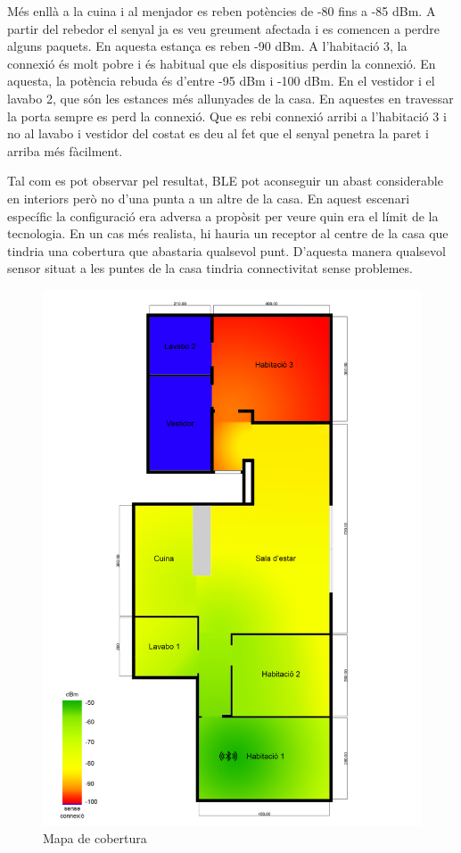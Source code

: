 Més enllà a la cuina i al menjador es reben potències de -80 fins a -85 dBm.
A partir del rebedor el senyal ja es veu greument afectada i es comencen a perdre alguns paquets. En aquesta estança es reben -90 dBm. A l'habitació 3, la connexió és molt pobre i és habitual que els dispositius perdin la connexió. En aquesta, la potència rebuda és d'entre -95 dBm i -100 dBm.
En el vestidor i el lavabo 2, que són les estances més allunyades de la casa. En aquestes en travessar la porta sempre es perd la connexió.
Que es rebi connexió arribi a l'habitació 3 i no al lavabo i vestidor del costat es deu al fet que el senyal penetra la paret i arriba més fàcilment.

Tal com es pot observar pel resultat, BLE pot aconseguir un abast considerable en interiors però no d'una punta a un altre de la casa.
En aquest escenari específic la configuració era adversa a propòsit per veure quin era el límit de la tecnologia.
En un cas més realista, hi hauria un receptor al centre de la casa que tindria una cobertura que abastaria qualsevol punt.
D'aquesta manera qualsevol sensor situat a les puntes de la casa tindria connectivitat sense problemes.
\newpage

\begin{figure}[!h]
	\begin{center}
		\includegraphics[width=\textwidth]{./images/hotmap.png}
		\caption{Mapa de cobertura}
		\label{heatmap}
	\end{center}
\end{figure}

